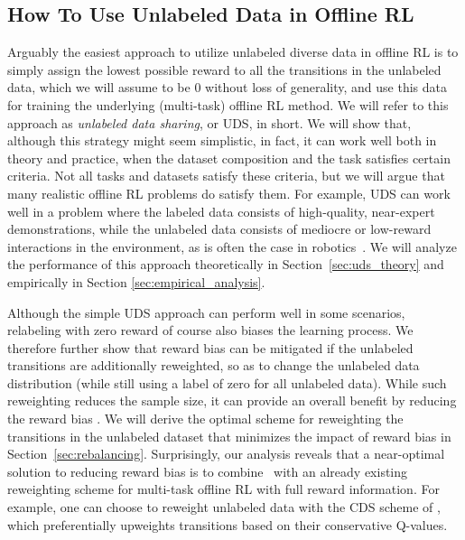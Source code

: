 \subsection{How To Use Unlabeled Data in Offline RL}
\vspace{-0.1cm}
\label{sec:method}
Arguably the easiest approach to utilize unlabeled diverse data in offline RL is to simply assign the lowest possible reward to all the transitions in the unlabeled data, which we will assume to be $0$ without loss of generality, and use this data for training the underlying (multi-task) offline RL method. We will refer to this approach as \emph{unlabeled data sharing}, or UDS, in short. We will show that, although this strategy might seem simplistic, in fact, it can work well both in theory and practice, when the dataset composition and the task satisfies certain criteria. Not all tasks and datasets satisfy these criteria, but we will argue that many realistic offline RL problems do satisfy them. For example, UDS can work well in a problem where the labeled data consists of high-quality, near-expert demonstrations, while the unlabeled data consists of mediocre or low-reward interactions in the environment, as is often the case in robotics~\citep{xie2019improvisation}. 
We will analyze the performance of this approach theoretically in Section~\ref{sec:uds_theory} and empirically in Section \ref{sec:empirical_analysis}.

Although the simple UDS approach can perform well in some scenarios, relabeling with zero reward of course also biases the learning process. We therefore further show that reward bias can be mitigated if the unlabeled transitions are additionally reweighted, so as to change the unlabeled data distribution (while still using a label of zero for all unlabeled data). While such reweighting reduces the sample size, it can provide an overall benefit by reducing the reward bias . We will derive the optimal scheme for reweighting the transitions in the unlabeled dataset that minimizes the impact of reward bias in Section~\ref{sec:rebalancing}. Surprisingly, our analysis reveals that a near-optimal solution to reducing reward bias is to combine \uds\ with an already existing reweighting scheme for multi-task offline RL with full reward information. For example, one can choose to reweight unlabeled data with the  {CDS} scheme of \citet{yu2021conservative}, which preferentially upweights transitions based on their conservative Q-values.

\vspace{-0.1cm}
